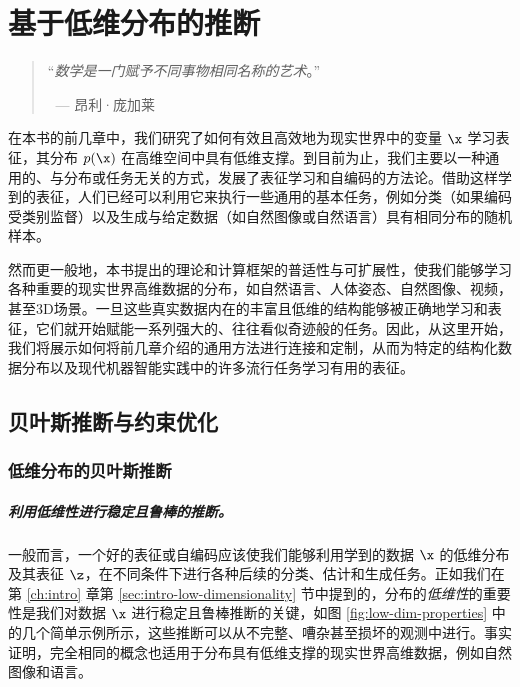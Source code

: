 \documentclass[../../book-main_zh.tex]{subfiles}
\begin{document}
\chapter{基于低维分布的推断}
\label{ch:conditional-inference}

\begin{quote}

    \hfill    ``{\em 数学是一门赋予不同事物相同名称的艺术}。''

    $~$ \hfill --- 昂利·庞加莱
\end{quote}
\vspace{5mm}

在本书的前几章中，我们研究了如何有效且高效地为现实世界中的变量 $\x$ 学习表征，其分布 $p(\x)$ 在高维空间中具有低维支撑。到目前为止，我们主要以一种通用的、与分布或任务无关的方式，发展了表征学习和自编码的方法论。借助这样学到的表征，人们已经可以利用它来执行一些通用的基本任务，例如分类（如果编码受类别监督）以及生成与给定数据（如自然图像或自然语言）具有相同分布的随机样本。

然而更一般地，本书提出的理论和计算框架的普适性与可扩展性，使我们能够学习各种重要的现实世界高维数据的分布，如自然语言、人体姿态、自然图像、视频，甚至3D场景。一旦这些真实数据内在的丰富且低维的结构能够被正确地学习和表征，它们就开始赋能一系列强大的、往往看似奇迹般的任务。因此，从这里开始，我们将展示如何将前几章介绍的通用方法进行连接和定制，从而为特定的结构化数据分布以及现代机器智能实践中的许多流行任务学习有用的表征。

\section{贝叶斯推断与约束优化}

\subsection{低维分布的贝叶斯推断}
\paragraph{利用低维性进行稳定且鲁棒的推断。}
一般而言，一个好的表征或自编码应该使我们能够利用学到的数据 $\x$ 的低维分布及其表征 $\z$，在不同条件下进行各种后续的分类、估计和生成任务。正如我们在第 \ref{ch:intro} 章第 \ref{sec:intro-low-dimensionality} 节中提到的，分布的{\em 低维性}的重要性是我们对数据 $\x$ 进行稳定且鲁棒推断的关键，如图 \ref{fig:low-dim-properties} 中的几个简单示例所示，这些推断可以从不完整、嘈杂甚至损坏的观测中进行。事实证明，完全相同的概念也适用于分布具有低维支撑的现实世界高维数据，例如自然图像和语言。
\end{document}
